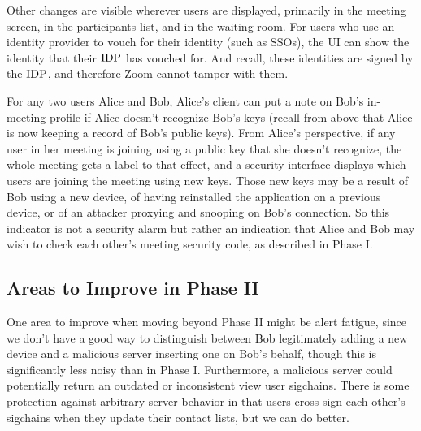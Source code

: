Other changes are visible wherever users are displayed, primarily in the meeting screen, in the participants list, and in the waiting room. For users who use an identity provider to vouch for their identity (such as SSOs), the UI can show the identity that their $\mathrm{IDP}$ has vouched for. And recall, these identities are signed by the $\mathrm{IDP}$, and therefore Zoom cannot tamper with them.

For any two users Alice and Bob, Alice's client can put a note on Bob's in-meeting profile if Alice doesn't recognize Bob's keys (recall from above that Alice is now keeping a record of Bob's public keys). From Alice's perspective, if any user in her meeting is joining using a public key that she doesn't recognize, the whole meeting gets a label to that effect, and a security interface displays which users are joining the meeting using new keys. Those new keys may be a result of Bob using a new device, of having reinstalled the application on a previous device, or of an attacker proxying and snooping on Bob's connection. So this indicator is not a security alarm but rather an indication that Alice and Bob may wish to check each other's meeting security code, as described in Phase I.

\subsection{Areas to Improve in Phase II}

One area to improve when moving beyond Phase II might be alert fatigue, since we don't have a good way to distinguish between Bob legitimately adding a new device and a malicious server inserting one on Bob's behalf, though this is significantly less noisy than in Phase I. Furthermore, a malicious server could potentially return an outdated or inconsistent view user sigchains. There is some protection against arbitrary server behavior in that users cross-sign each other's sigchains when they update their contact lists, but we can do better.